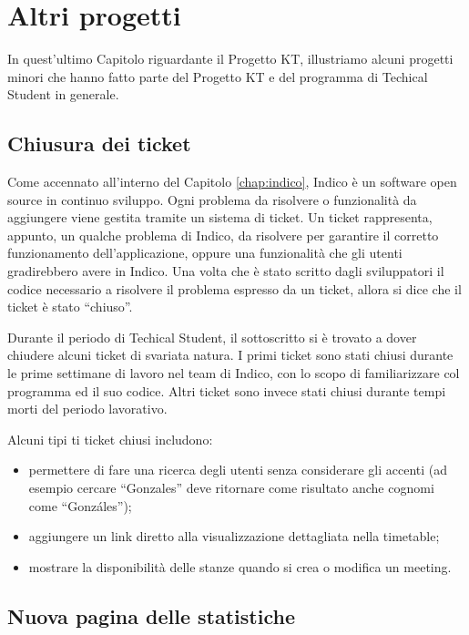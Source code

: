 \chapter{Altri progetti} \label{chap:altri_progetti}

    In quest'ultimo Capitolo riguardante il Progetto KT, illustriamo alcuni progetti minori che hanno fatto parte del Progetto KT e del programma di Techical Student in generale.

    \section{Chiusura dei ticket} \label{sec:ap;chiusura_ticket}
    
        Come accennato all'interno del Capitolo \ref{chap:indico}, Indico è un software open source in continuo sviluppo. Ogni problema da risolvere o funzionalità da aggiungere viene gestita tramite un sistema di ticket. Un ticket rappresenta, appunto, un qualche problema di Indico, da risolvere per garantire il corretto funzionamento dell'applicazione, oppure una funzionalità che gli utenti gradirebbero avere in Indico. Una volta che è stato scritto dagli sviluppatori il codice necessario a risolvere il problema espresso da un ticket, allora si dice che il ticket è stato ``chiuso''.
        
        Durante il periodo di Techical Student, il sottoscritto si è trovato a dover chiudere alcuni ticket di svariata natura. I primi ticket sono stati chiusi durante le prime settimane di lavoro nel team di Indico, con lo scopo di familiarizzare col programma ed il suo codice. Altri ticket sono invece stati chiusi durante tempi morti del periodo lavorativo.
        
        Alcuni tipi ti ticket chiusi includono:
        
        \begin{itemize}
            \item permettere di fare una ricerca degli utenti senza considerare gli accenti (ad esempio cercare ``Gonzales'' deve ritornare come risultato anche cognomi come ``Gonzáles'');
            \item aggiungere un link diretto alla visualizzazione dettagliata nella timetable;
            \item mostrare la disponibilità delle stanze quando si crea o modifica un meeting.
        \end{itemize}
    
    \section{Nuova pagina delle statistiche} \label{sec:ap;nuova_pagina_statistiche}
    
